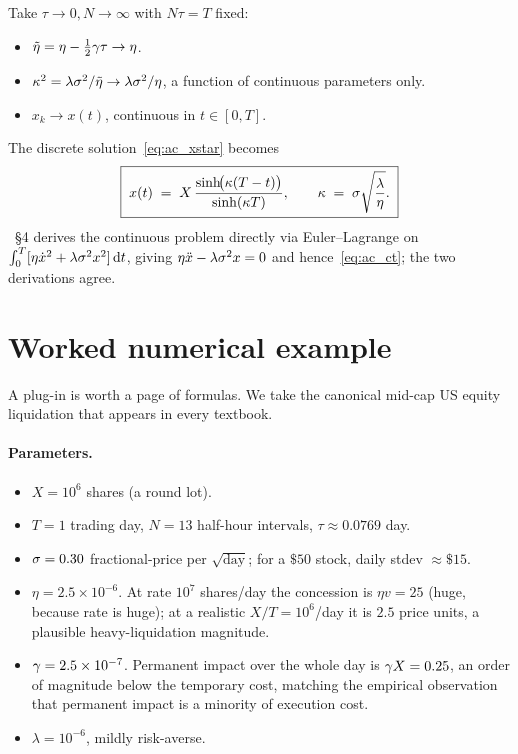 Take $\tau \to 0, N \to \infty$ with $N\tau = T$ fixed:
\begin{itemize}
  \item $\tilde\eta = \eta - \tfrac{1}{2}\gamma\tau \to \eta$.
  \item $\kappa^2 = \lambda\sigma^2/\tilde\eta \to
  \lambda\sigma^2/\eta$, a function of continuous parameters only.
  \item $x_k \to x(t)$, continuous in $t \in [0, T]$.
\end{itemize}
The discrete solution~\eqref{eq:ac_xstar} becomes
\begin{equation}
  \boxed{\;
  x(t) \;=\; X\,\frac{\sinh\!\bigl(\kappa(T - t)\bigr)}{\sinh(\kappa T)},
  \qquad \kappa \;=\; \sigma\sqrt{\frac{\lambda}{\eta}}.
  \;}
  \label{eq:ac_ct}
\end{equation}
\citeAC{}~\S4 derives the continuous problem directly via
Euler--Lagrange on $\int_0^T[\eta\dot{x}^2 + \lambda\sigma^2
x^2]\,\mathrm{d}t$, giving $\eta\ddot{x} - \lambda\sigma^2 x = 0$
and hence~\eqref{eq:ac_ct}; the two derivations agree.

\section{Worked numerical example}
\label{sec:ac_worked}

A plug-in is worth a page of formulas. We take the canonical
mid-cap US equity liquidation that appears in every textbook.

\paragraph{Parameters.}
\begin{itemize}
  \item $X = 10^6$ shares (a round lot).
  \item $T = 1$ trading day, $N = 13$ half-hour intervals,
  $\tau \approx 0.0769$ day.
  \item $\sigma = 0.30$ fractional-price per $\sqrt{\text{day}}$;
  for a $\$50$ stock, daily stdev $\approx \$15$.
  \item $\eta = 2.5\times 10^{-6}$. At rate $10^7$ shares/day the
  concession is $\eta v = 25$ (huge, because rate is huge); at a
  realistic $X/T = 10^6$/day it is $2.5$ price units, a plausible
  heavy-liquidation magnitude.
  \item $\gamma = 2.5\times 10^{-7}$. Permanent impact over the
  whole day is $\gamma X = 0.25$, an order of magnitude below
  the temporary cost, matching the empirical observation that
  permanent impact is a minority of execution cost.
  \item $\lambda = 10^{-6}$, mildly risk-averse.
\end{itemize}

